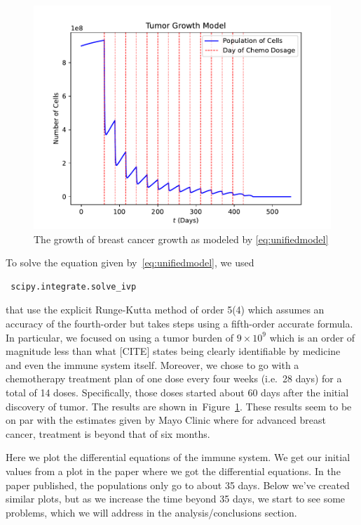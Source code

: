 \documentclass[11pt]{amsart}
\begin{document}
\begin{figure}[h!]
\begin{center} %
\includegraphics[scale=0.6]{./images/tumor_growth.pdf} %
\end{center}
\caption{The growth of breast cancer growth as modeled by \eqref{eq:unifiedmodel} }
\label{fig:FullODE} %
\end{figure}
To solve the equation given by\ \eqref{eq:unifiedmodel}, we used \begin{verbatim} scipy.integrate.solve_ivp \end{verbatim}
that use the explicit Runge-Kutta method of order 5(4) which assumes an accuracy of the fourth-order but takes steps using a fifth-order accurate formula.
In particular, we focused on using a tumor burden of $9\times10^9$ which is an order of magnitude less than what [CITE] states being clearly identifiable by medicine and even the immune system itself. 
Moreover, we chose to go with a chemotherapy treatment plan of one dose every four weeks (i.e.\ 28 days) for a total of 14 doses.
Specifically, those doses started about 60 days after the initial discovery of tumor.
The results are shown in\ Figure~\ref{fig:FullODE}.
These results seem to be on par with the estimates given by Mayo Clinic where for advanced breast cancer, treatment is beyond that of six months.

Here we plot the differential equations of the immune system. 
We get our initial values from a plot in the paper where we got the differential equations. 
In the paper published, the populations only go to about 35 days. 
Below we've created similar plots, but as we increase the time beyond 35 days, 
we start to see some problems, which we will address in the analysis/conclusions section.
\end{document}
